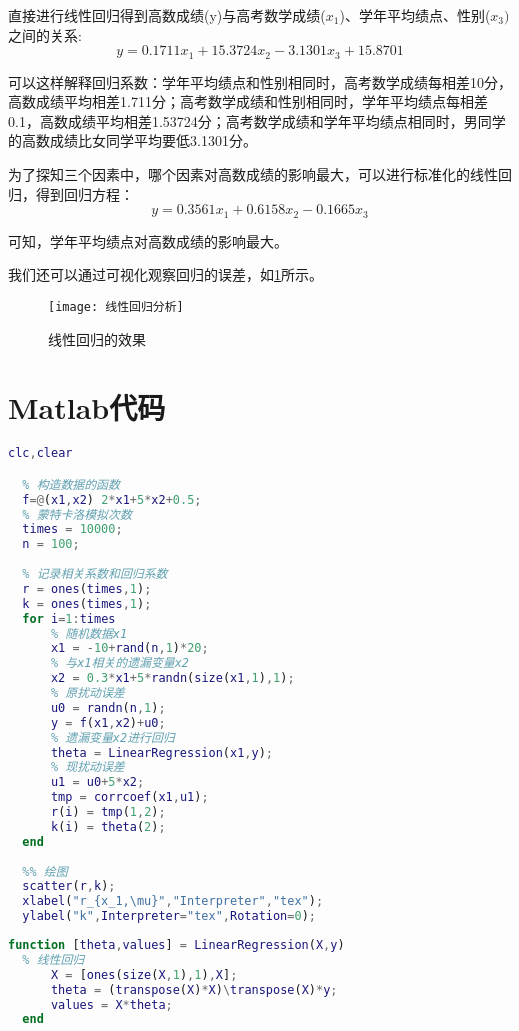 \documentclass[withoutpreface]{cumcmthesis}
\begin{document}
直接进行线性回归得到高数成绩(y)与高考数学成绩($x_1$)、学年平均绩点、性别($x_3)$之间的关系:
\begin{equation}
  y = 0.1711 x_1 +  15.3724 x_2  -3.1301 x_3 + 15.8701
\end{equation}

可以这样解释回归系数：学年平均绩点和性别相同时，高考数学成绩每相差10分，高数成绩平均相差1.711分；高考数学成绩和性别相同时，学年平均绩点每相差0.1，高数成绩平均相差1.53724分；高考数学成绩和学年平均绩点相同时，男同学的高数成绩比女同学平均要低3.1301分。

为了探知三个因素中，哪个因素对高数成绩的影响最大，可以进行标准化的线性回归，得到回归方程：
\begin{equation}
  y = 0.3561 x_1 +  0.6158 x_2  -0.1665 x_3
\end{equation}

可知，学年平均绩点对高数成绩的影响最大。

我们还可以通过可视化观察回归的误差，如\cref{Fig:2}所示。
\begin{figure}[H]
  \centering
  \texttt{[image: 线性回归分析]}
  \caption{线性回归的效果}\label{Fig:2}
\end{figure}

\appendix
\section{Matlab代码}
  \begin{lstlisting}[language=matlab,caption={蒙特卡洛模拟}]
  clc,clear

  % 构造数据的函数
  f=@(x1,x2) 2*x1+5*x2+0.5;
  % 蒙特卡洛模拟次数
  times = 10000;
  n = 100;
  
  % 记录相关系数和回归系数
  r = ones(times,1);
  k = ones(times,1);
  for i=1:times
      % 随机数据x1
      x1 = -10+rand(n,1)*20;
      % 与x1相关的遗漏变量x2
      x2 = 0.3*x1+5*randn(size(x1,1),1);
      % 原扰动误差
      u0 = randn(n,1);
      y = f(x1,x2)+u0;
      % 遗漏变量x2进行回归
      theta = LinearRegression(x1,y);
      % 现扰动误差
      u1 = u0+5*x2;
      tmp = corrcoef(x1,u1);
      r(i) = tmp(1,2);
      k(i) = theta(2);
  end
  
  %% 绘图
  scatter(r,k);
  xlabel("r_{x_1,\mu}","Interpreter","tex");
  ylabel("k",Interpreter="tex",Rotation=0);
  \end{lstlisting}

  \begin{lstlisting}[language=matlab ,caption={自定义的线性回归函数} ]
  function [theta,values] = LinearRegression(X,y)
  % 线性回归
      X = [ones(size(X,1),1),X];
      theta = (transpose(X)*X)\transpose(X)*y;
      values = X*theta;
  end
  \end{lstlisting}
\end{document}
